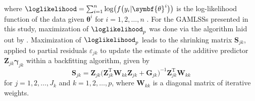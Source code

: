 where \(\loglikelihood = \sum_{i = 1}^n \log\bigl(f\bigl(y_i | \symbf{\theta}^i\bigr)\bigr)\) is the log-likelihood function of the data given \(\symbf{\theta}^i\) for \(i = 1, 2, \ldots, n\) \parencite{Rigby2005}.  For the GAMLSSs presented in this study, maximization of \(\loglikelihood_p\) was done via the algorithm laid out by \textcite{Rigby1996}.  Maximization of \(\loglikelihood_p\) leads to the shrinking matrix \(\symbf{S}_{j k}\), applied to partial residuals \(\varepsilon_{j k}\) to update the estimate of the additive predictor \(\symbf{Z}_{j k} \symbf{\gamma}_{j k}\) within a backfitting algorithm, given by
\begin{equation}
  \label{eq:GAMLSSRigbyStasinopoulos2005BackfittingAlgorithm}
  \symbf{S}_{j k} = \symbf{Z}_{j k} \bigl(\symbf{Z}_{j k}^{\text{T}} \symbf{W}_{k k} \symbf{Z}_{j k} + \symbf{G}_{j k}\bigr)^{-1} \symbf{Z}_{j k}^{\text{T}} \symbf{W}_{k k}
\end{equation}
for \(j = 1, 2, \ldots, J_k\) and \(k = 1, 2, \ldots, p\), where \(\symbf{W}_{k k}\) is a diagonal matrix of iterative weights.  %

